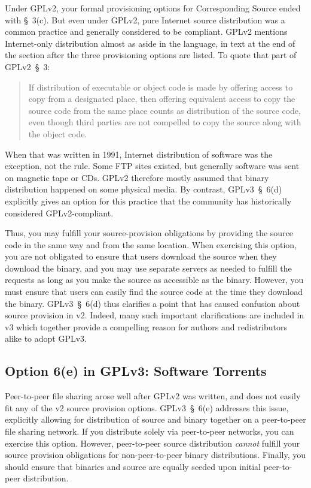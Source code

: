 Under GPLv2, your formal provisioning options for Corresponding Source
ended with \S~3(c).  But even under GPLv2, pure Internet source
distribution was a common practice and generally considered to be
compliant.  GPLv2 mentions Internet-only distribution almost as aside in
the language, in text at the end of the section after the three
provisioning options are listed.  To quote that part of GPLv2~\S~3:
\begin{quote}
If distribution of executable or object code is made by offering access to
copy from a designated place, then offering equivalent access to copy the
source code from the same place counts as distribution of the source code,
even though third parties are not compelled to copy the source along with
the object code.
\end{quote}

When that was written in 1991, Internet distribution of software was the
exception, not the rule.  Some FTP sites existed, but generally software
was sent on magnetic tape or CDs.  GPLv2 therefore mostly assumed that
binary distribution happened on some physical media.  By contrast,
GPLv3~\S~6(d) explicitly gives an option for this practice that the
community has historically considered GPLv2-compliant.

Thus, you may fulfill your source-provision obligations by providing the
source code in the same way and from the same location.  When exercising
this option, you are not obligated to ensure that users download the
source when they download the binary, and you may use separate servers as
needed to fulfill the requests as long as you make the source as
accessible as the binary.  However, you must ensure that users can easily
find the source code at the time they download the binary. GPLv3~\S~6(d)
thus clarifies a point that has caused confusion about source provision in
v2.  Indeed, many such important clarifications are included in v3 which
together provide a compelling reason for authors and redistributors alike
to adopt GPLv3.

\subsection{Option 6(e) in GPLv3: Software Torrents}

Peer-to-peer file sharing arose well after GPLv2 was written, and does not
easily fit any of the v2 source provision options.  GPLv3~\S~6(e)
addresses this issue, explicitly allowing for distribution of source and
binary together on a peer-to-peer file sharing network.  If you distribute
solely via peer-to-peer networks, you can exercise this option.  However,
peer-to-peer source distribution \emph{cannot} fulfill your source
provision obligations for non-peer-to-peer binary distributions.  Finally,
you should ensure that binaries and source are equally seeded upon initial
peer-to-peer distribution.

